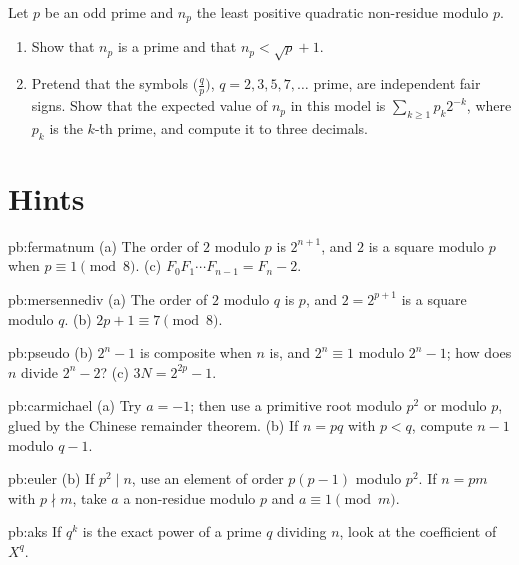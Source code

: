 \begin{exercise}[$\star\star$]\label{pb:leastqnr}
Let $p$ be an odd prime and $n_p$ the least positive quadratic non-residue modulo $p$.
\begin{enumerate}[label=(\alph*)]
\item Show that $n_p$ is a prime and that $n_p<\sqrt p+1$.
\item Pretend that the symbols $\bigl(\frac qp\bigr)$, $q=2,3,5,7,\dots$ prime, are independent fair signs. Show that the expected
value of $n_p$ in this model is $\sum_{k\ge1}p_k2^{-k}$, where $p_k$ is the $k$-th prime, and compute it to three decimals.
\end{enumerate}
\end{exercise}

\section{Hints}

\begin{hint}{pb:fermatnum}
(a) The order of $2$ modulo $p$ is $2^{n+1}$, and $2$ is a square modulo $p$ when $p\equiv1\pmod8$. (c) $F_0F_1\cdots F_{n-1}=F_n-2$.
\end{hint}

\begin{hint}{pb:mersennediv}
(a) The order of $2$ modulo $q$ is $p$, and $2=2^{p+1}$ is a square modulo $q$. (b) $2p+1\equiv7\pmod8$.
\end{hint}

\begin{hint}{pb:pseudo}
(b) $2^n-1$ is composite when $n$ is, and $2^n\equiv1$ modulo $2^n-1$; how does $n$ divide $2^n-2$? (c) $3N=2^{2p}-1$.
\end{hint}

\begin{hint}{pb:carmichael}
(a) Try $a=-1$; then use a primitive root modulo $p^2$ or modulo $p$, glued by the Chinese remainder theorem. (b) If $n=pq$
with $p<q$, compute $n-1$ modulo $q-1$.
\end{hint}

\begin{hint}{pb:euler}
(b) If $p^2\mid n$, use an element of order $p(p-1)$ modulo $p^2$. If $n=pm$ with $p\nmid m$, take $a$ a non-residue modulo $p$
and $a\equiv1\pmod m$.
\end{hint}

\begin{hint}{pb:aks}
If $q^k$ is the exact power of a prime $q$ dividing $n$, look at the coefficient of $X^q$.
\end{hint}

